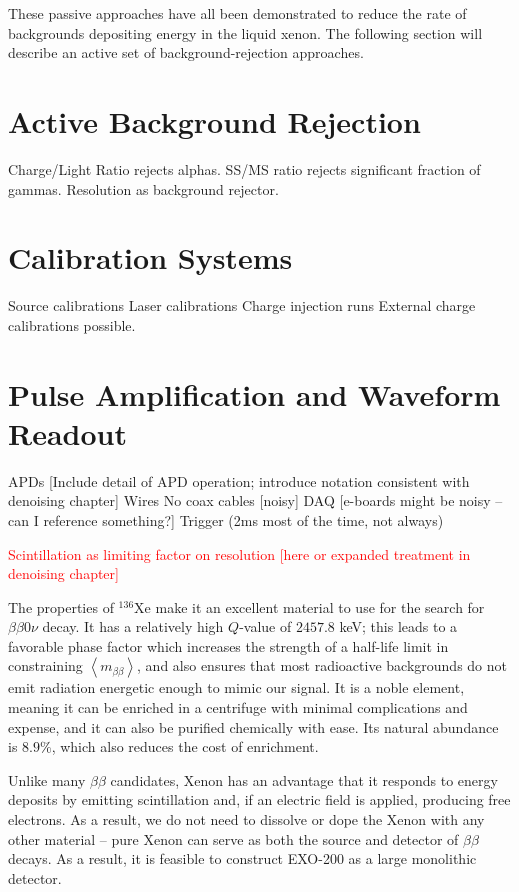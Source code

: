 These passive approaches have all been demonstrated to reduce the rate of backgrounds depositing energy in the liquid xenon.  The following section will describe an active set of background-rejection approaches.

\section{Active Background Rejection}\label{sec:DetectorActiveBackgroundRejection}
	Charge/Light Ratio rejects alphas.
	SS/MS ratio rejects significant fraction of gammas.
	Resolution as background rejector.

\section{Calibration Systems}\label{sec:DetectorCalibration}
	Source calibrations
	Laser calibrations
	Charge injection runs
	External charge calibrations possible.

\section{Pulse Amplification and Waveform Readout}\label{sec:DetectorReadout}
	APDs [Include detail of APD operation; introduce notation consistent with denoising chapter]
	Wires
	No coax cables [noisy]
	DAQ [e-boards might be noisy -- can I reference something?]
	Trigger (2ms most of the time, not always)



\textcolor{red}{Scintillation as limiting factor on resolution [here or expanded treatment in denoising chapter]}








The properties of $^{136}$Xe make it an excellent material to use for the search for $\beta\beta 0\nu$ decay.  It has a relatively high $Q$-value of $2457.8$ keV; this leads to a favorable phase factor which increases the strength of a half-life limit in constraining $\left<m_{\beta\beta}\right>$, and also ensures that most radioactive backgrounds do not emit radiation energetic enough to mimic our signal.  It is a noble element, meaning it can be enriched in a centrifuge with minimal complications and expense, and it can also be purified chemically with ease.  Its natural abundance is $8.9\%$, which also reduces the cost of enrichment.

Unlike many $\beta\beta$ candidates, Xenon has an advantage that it responds to energy deposits by emitting scintillation and, if an electric field is applied, producing free electrons.  As a result, we do not need to dissolve or dope the Xenon with any other material -- pure Xenon can serve as both the source and detector of $\beta\beta$ decays.  As a result, it is feasible to construct EXO-200 as a large monolithic detector.


